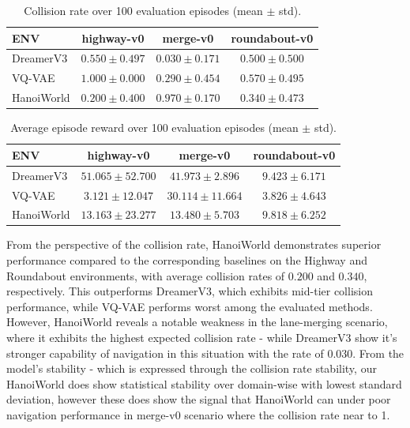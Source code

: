 \begin{table}[!h]
\centering
\caption{Collision rate over 100 evaluation episodes (mean $\pm$ std).}
\label{tab:collision_rate}
\begin{tabular}{lccc}
\hline
\textbf{ENV} & \textbf{highway-v0} & \textbf{merge-v0} & \textbf{roundabout-v0} \\
\hline
DreamerV3   & $0.550 \pm 0.497$ & $0.030 \pm 0.171$ & $0.500 \pm 0.500$ \\
VQ-VAE      & $1.000 \pm 0.000$ & $0.290 \pm 0.454$ & $0.570 \pm 0.495$ \\
HanoiWorld & $0.200 \pm 0.400$ & $0.970 \pm 0.170$ & $0.340 \pm 0.473$ \\
\hline
\end{tabular}
\end{table}

\begin{table}[!h]
\centering
\caption{Average episode reward over 100 evaluation episodes (mean $\pm$ std).}
\label{tab:avg_reward}
\begin{tabular}{lccc}
\hline
\textbf{ENV} & \textbf{highway-v0} & \textbf{merge-v0} & \textbf{roundabout-v0} \\
\hline
DreamerV3   & $51.065 \pm 52.700$ & $41.973 \pm 2.896$ & $9.423 \pm 6.171$ \\
VQ-VAE      & $3.121 \pm 12.047$  & $30.114 \pm 11.664$ & $3.826 \pm 4.643$ \\
HanoiWorld & $13.163 \pm 23.277$ & $13.480 \pm 5.703$ & $9.818 \pm 6.252$ \\
\hline
\end{tabular}
\end{table}

From the perspective of the collision rate, HanoiWorld demonstrates superior performance compared to the corresponding baselines on the Highway and Roundabout environments, with average collision rates of $0.200$ and $0.340$, respectively. This outperforms DreamerV3, which exhibits mid-tier collision performance, while VQ-VAE performs worst among the evaluated methods. However, HanoiWorld reveals a notable weakness in the lane-merging scenario, where it exhibits the highest expected collision rate - while DreamerV3 show it's stronger capability of navigation in this situation with the rate of $0.030$. From the model's stability - which is expressed through the collision rate stability, our HanoiWorld does show statistical stability over domain-wise with lowest standard deviation, however these does show the signal that HanoiWorld can under poor navigation performance in merge-v0 scenario where the collision rate near to 1.

